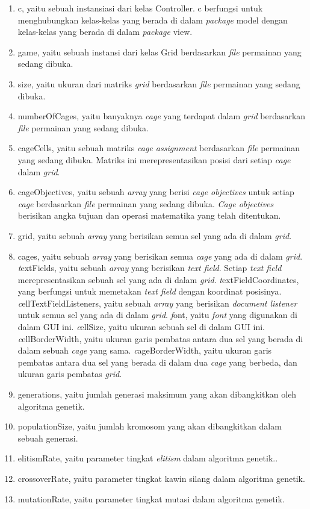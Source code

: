 \begin{enumerate}
\item c, yaitu sebuah instansiasi dari kelas Controller. c berfungsi untuk menghubungkan kelas-kelas yang berada di dalam \textit{package} model dengan kelas-kelas yang berada di dalam \textit{package} view.
\item game, yaitu sebuah instansi dari kelas Grid berdasarkan \textit{file} permainan yang sedang dibuka.
\item size, yaitu ukuran dari matriks \textit{grid} berdasarkan \textit{file} permainan yang sedang dibuka.
\item numberOfCages, yaitu banyaknya \textit{cage} yang terdapat dalam \textit{grid} berdasarkan \textit{file} permainan yang sedang dibuka.
\item cageCells, yaitu sebuah matriks \textit{cage assignment} berdasarkan \textit{file} permainan yang sedang dibuka. Matriks ini merepresentasikan posisi dari setiap \textit{cage} dalam \textit{grid}.
\item cageObjectives, yaitu sebuah \textit{array} yang berisi \textit{cage objectives} untuk setiap \textit{cage} berdasarkan \textit{file} permainan yang sedang dibuka. \textit{Cage objectives} berisikan angka tujuan dan operasi matematika yang telah ditentukan.
\item grid, yaitu sebuah \textit{array} yang berisikan semua sel yang ada di dalam \textit{grid}.
\item cages, yaitu sebuah \textit{array} yang berisikan semua \textit{cage} yang ada di dalam \textit{grid}.
\textit textFields, yaitu sebuah \textit{array} yang berisikan \textit{text field}. Setiap \textit{text field} merepresentasikan sebuah sel yang ada di dalam \textit{grid}.
\textit textFieldCoordinates, yang berfungsi untuk memetakan \textit{text field} dengan koordinat posisinya.
\textit cellTextFieldListeners, yaitu sebuah \textit{array} yang berisikan \textit{document listener} untuk semua sel yang ada di dalam \textit{grid}.
\textit font, yaitu \textit{font} yang digunakan di dalam GUI ini.
\textit cellSize, yaitu ukuran sebuah sel di dalam GUI ini.
\textit cellBorderWidth, yaitu ukuran garis pembatas antara dua sel yang berada di dalam sebuah \textit{cage} yang sama.
\textit cageBorderWidth, yaitu ukuran garis pembatas antara dua sel yang berada di dalam dua \textit{cage} yang berbeda, dan ukuran garis pembatas \textit{grid}.
\item generations, yaitu jumlah generasi maksimum yang akan dibangkitkan oleh algoritma genetik.
\item populationSize, yaitu jumlah kromosom yang akan dibangkitkan dalam sebuah generasi.
\item elitismRate, yaitu parameter tingkat \textit{elitism} dalam algoritma genetik..
\item crossoverRate, yaitu parameter tingkat kawin silang dalam algoritma genetik.
\item mutationRate, yaitu parameter tingkat mutasi dalam algoritma genetik.
\end{enumerate}

